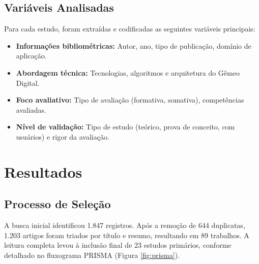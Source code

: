 \documentclass[english, spanish, brazilian]{RBIEarticle} %
\begin{document}
\subsection{Variáveis Analisadas}
Para cada estudo, foram extraídas e codificadas as seguintes variáveis principais:
\begin{itemize}
    \item \textbf{Informações bibliométricas:} Autor, ano, tipo de publicação, domínio de aplicação.
    \item \textbf{Abordagem técnica:} Tecnologias, algoritmos e arquitetura do Gêmeo Digital.
    \item \textbf{Foco avaliativo:} Tipo de avaliação (formativa, somativa), competências avaliadas.
    \item \textbf{Nível de validação:} Tipo de estudo (teórico, prova de conceito, com usuários) e rigor da avaliação.
\end{itemize}

\section{Resultados}

\subsection{Processo de Seleção}

A busca inicial identificou 1.847 registros. Após a remoção de 644 duplicatas, 1.203 artigos foram triados por título e resumo, resultando em 89 trabalhos. A leitura completa levou à inclusão final de 23 estudos primários, conforme detalhado no fluxograma PRISMA (Figura \ref{fig:prisma}).
\end{document}
